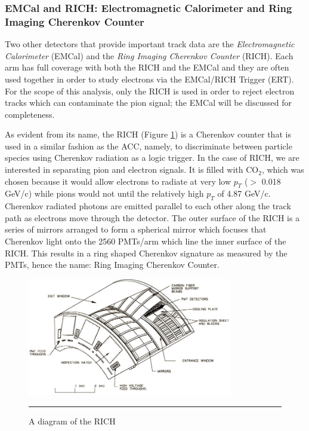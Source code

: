 \subsubsection{EMCal and RICH: Electromagnetic Calorimeter and Ring Imaging Cherenkov Counter}
Two other detectors that provide important track data are the \textit{Electromagnetic Calorimeter} (EMCal) and the \textit{Ring Imaging Cherenkov Counter} (RICH). Each arm has full coverage with both the RICH and the EMCal and they are often used together in order to study electrons via the EMCal/RICH Trigger (ERT). For the scope of this analysis, only the RICH is used in order to reject electron tracks which can contaminate the pion signal; the EMCal will be discussed for completeness.

As evident from its name, the RICH (Figure \ref{fig:RICHdiagram}) is a Cherenkov counter that is used in a similar fashion as the ACC, namely, to discriminate between particle species using Cherenkov radiation as a logic trigger. In the case of RICH, we are interested in separating pion and electron signals. It is filled with CO$_2$, which was chosen because it would allow electrons to radiate at very low $p_T$ ($>$ 0.018 GeV/c) while pions would not until the relatively high $p_T$ of 4.87 GeV/c. Cherenkov radiated photons are emitted parallel to each other along the track path as electrons move through the detector. The outer surface of the RICH is a series of mirrors arranged to form a spherical mirror which focuses that Cherenkov light onto the 2560 PMTs/arm which line the inner surface of the RICH. This results in a ring shaped Cherenkov signature as measured by the PMTs, hence the name: Ring Imaging Cherenkov Counter. 

\begin{figure}[h!]
  \centering
    \includegraphics[width=0.8\textwidth]{Figures/RICHdiagram.jpg}
    \rule{35em}{0.5pt}
  \caption[A diagram of the RICH]{A diagram of the RICH}
  \label{fig:RICHdiagram}
\end{figure}

